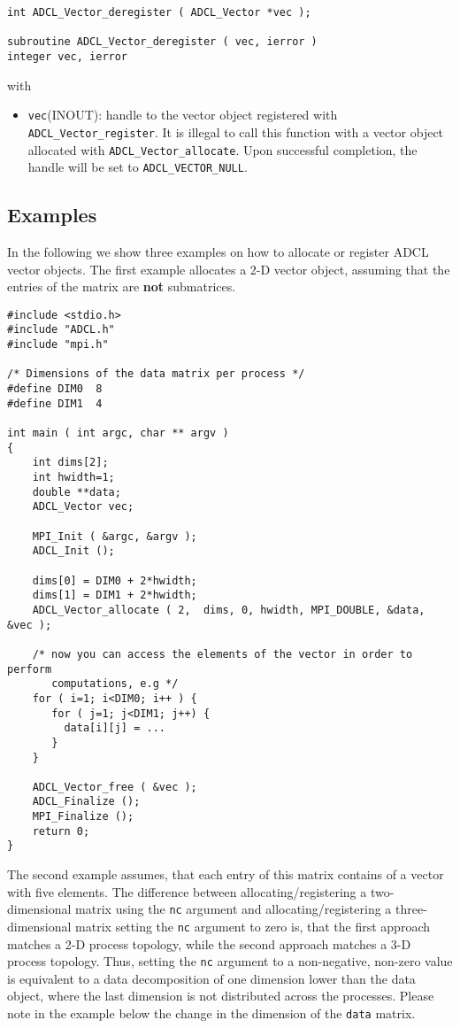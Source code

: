 \begin{verbatim}
int ADCL_Vector_deregister ( ADCL_Vector *vec );

subroutine ADCL_Vector_deregister ( vec, ierror )
integer vec, ierror
\end{verbatim}
with
\begin{itemize}
\item {\tt vec}(INOUT): handle to the vector object registered with {\tt ADCL\_Vector\-\_register}. It is illegal to call 
 this function with a vector object allocated with {\tt ADCL\_Vector\_allocate}. Upon successful completion, the handle will be set to {\tt ADCL\_VECTOR\_NULL}.
\end{itemize}

\subsection{Examples}
In the following we show three examples on how to allocate or register ADCL vector objects. The first example allocates a 2-D vector object, assuming that the entries of the matrix are {\bf not } submatrices.

\begin{verbatim}
#include <stdio.h>
#include "ADCL.h"
#include "mpi.h"

/* Dimensions of the data matrix per process */
#define DIM0  8
#define DIM1  4

int main ( int argc, char ** argv ) 
{
    int dims[2];
    int hwidth=1;
    double **data;
    ADCL_Vector vec;
    
    MPI_Init ( &argc, &argv );
    ADCL_Init ();
    
    dims[0] = DIM0 + 2*hwidth;
    dims[1] = DIM1 + 2*hwidth;
    ADCL_Vector_allocate ( 2,  dims, 0, hwidth, MPI_DOUBLE, &data, &vec );
    
    /* now you can access the elements of the vector in order to perform 
       computations, e.g */
    for ( i=1; i<DIM0; i++ ) {
       for ( j=1; j<DIM1; j++) {
         data[i][j] = ...
       }
    }
    
    ADCL_Vector_free ( &vec );        
    ADCL_Finalize ();
    MPI_Finalize ();
    return 0;
}
\end{verbatim}

The second example assumes, that each entry of this matrix contains of a vector with five elements. The difference between 
allocating/registering a two-dimensional matrix using the {\tt nc} argument and allocating/registering a three-dimensional matrix setting the {\tt nc} argument to zero is, that the first approach  matches a 2-D process topology, while  the second approach matches a 3-D process topology. Thus, setting the {\tt nc} argument  to a non-negative, non-zero value is equivalent to a data decomposition of one dimension lower than the data object, where the last dimension is not distributed across the processes. Please note in the example below the change in the dimension of the {\tt data} matrix.

